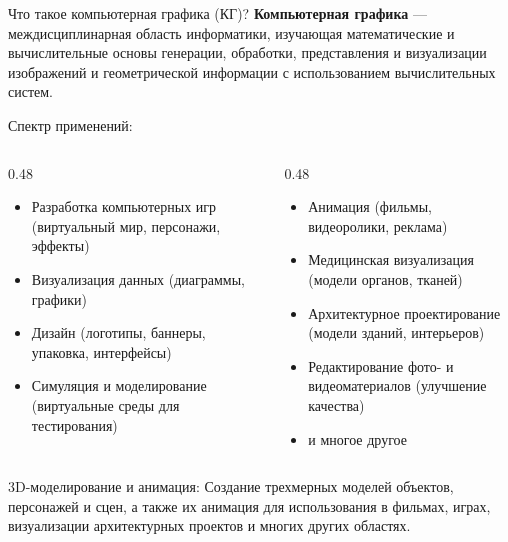 \documentclass{beamer}
\begin{document}
	\begin{frame}{Что такое компьютерная графика (КГ)?}
		\textbf{Компьютерная графика} --- междисциплинарная область информатики, изучающая математические и вычислительные основы генерации, обработки, представления и визуализации изображений и геометрической информации с использованием вычислительных систем.

		{
			\small
			Спектр применений:
			\vskip-4mm
			\begin{columns}[t]
				\begin{column}{0.48\textwidth}
					{\footnotesize
						\begin{itemize}
							\item Разработка компьютерных игр (виртуальный мир, персонажи, эффекты)
							\item Визуализация данных (диаграммы, графики)
							\item Дизайн (логотипы, баннеры, упаковка, интерфейсы)
							\item Симуляция и моделирование (виртуальные среды для тестирования)
						\end{itemize}
					}
				\end{column}
				\begin{column}{0.48\textwidth}
					{\footnotesize
						\begin{itemize}
							\item Анимация (фильмы, видеоролики, реклама)
							\item Медицинская визуализация (модели органов, тканей)
							\item Архитектурное проектирование (модели зданий, интерьеров)
							\item Редактирование фото- и видеоматериалов (улучшение качества)
							\item и многое другое
						\end{itemize}
					}
				\end{column}
			\end{columns}
		}
		
		3D-моделирование и анимация: Создание трехмерных моделей объектов, персонажей и сцен, а также их анимация для использования в фильмах, играх, визуализации архитектурных проектов и многих других областях.
		

\end{frame}
\end{document}
